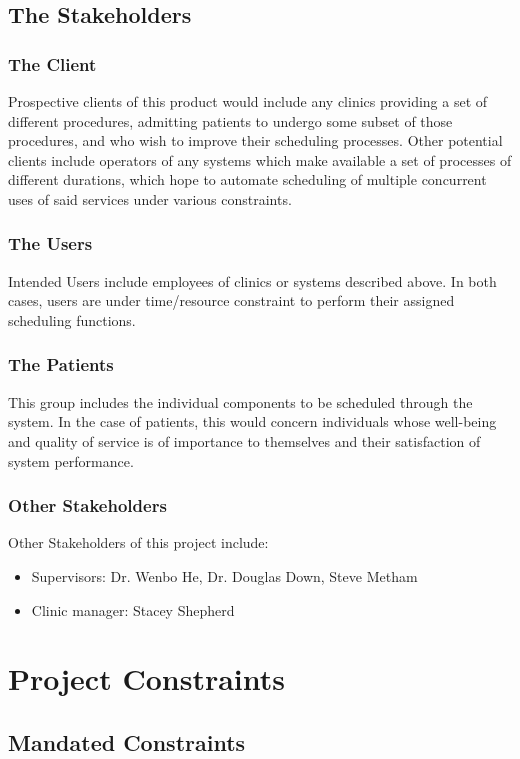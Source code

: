 \documentclass[12pt, titlepage]{article}
\begin{document}
\subsection{The Stakeholders}
\subsubsection{The Client}
Prospective clients of this product would include any clinics providing a set of different procedures, admitting patients to undergo some subset of those procedures, and who wish to improve their scheduling processes. Other potential clients include operators of any systems which make available a set of processes of different durations, which hope to automate scheduling of multiple concurrent uses of said services under various constraints.
\subsubsection{The Users}
Intended Users include employees of clinics or systems described above. In both cases, users are under time/resource constraint to perform their assigned scheduling functions.
\subsubsection{The Patients}
This group includes the individual components to be scheduled through the system. In the case of patients, this would concern individuals whose well-being and quality of service is of importance to themselves and their satisfaction of system performance.
\subsubsection{Other Stakeholders}
Other Stakeholders of this project include:
\begin{itemize}
  \item     Supervisors: Dr. Wenbo He, Dr. Douglas Down, Steve Metham
  \item 	Clinic manager: Stacey Shepherd
\end{itemize}

\section{Project Constraints}
\subsection{Mandated Constraints}
\end{document}
